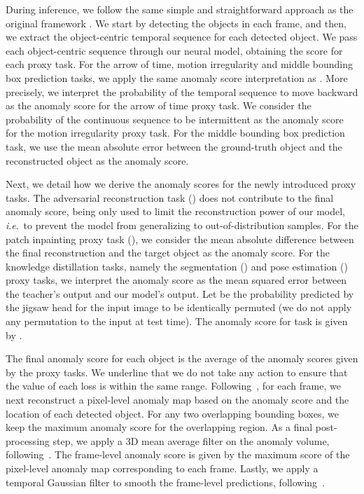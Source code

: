 \documentclass[times,twocolumn,final,authoryear]{elsarticle}
\newcommand{\ie}{\textit{i}.\textit{e}.}
\begin{document}
During inference, we follow the same simple and straightforward approach as the original framework \citep{Georgescu-CVPR-2021}. We start by detecting the objects in each frame, and then, we extract the object-centric temporal sequence for each detected object. We pass each object-centric sequence  through our neural model, obtaining the score for each proxy task. 
For the arrow of time, motion irregularity and middle bounding box prediction tasks, we apply the same anomaly score interpretation as \cite{Georgescu-CVPR-2021}. More precisely,  we interpret the probability of the temporal sequence to move backward as the anomaly score for the arrow of time proxy task. We consider the probability of the continuous sequence  to be intermittent as the anomaly score for the motion irregularity proxy task. For the middle bounding box prediction task, we use the mean absolute error between the ground-truth object and the reconstructed object as the anomaly score. 

Next, we detail how  we derive the anomaly scores for the newly introduced proxy tasks.
The adversarial reconstruction task () does not contribute to the final anomaly score, being only used to limit the reconstruction power of our model, \ie~to prevent the model from generalizing to out-of-distribution samples.
For the patch inpainting proxy task (), we consider the mean absolute difference between the final reconstruction and the target object as the anomaly score. For the knowledge distillation tasks, namely the segmentation () and pose estimation () proxy tasks, we interpret the anomaly score as the mean squared error between the teacher's output and our model's output. 
Let  be the probability predicted by the jigsaw head for the input image to be identically permuted (we do not apply any permutation to the input at test time). The anomaly score for task  is given by .

The final anomaly score for each object is the average of the anomaly scores given by the proxy tasks. We underline that we do not take any action to ensure that the value of each loss is within the same range. Following~\cite{Georgescu-CVPR-2021}, for each frame, we next reconstruct a pixel-level anomaly map based on the anomaly score and the location of each detected object. For any two overlapping bounding boxes, we keep the maximum anomaly score for the overlapping region. As a final post-processing step, we apply a 3D mean average filter on the anomaly volume, following~\cite{Giorno-ECCV-2016}. The frame-level anomaly score is given by the maximum score of the pixel-level anomaly map corresponding to each frame. Lastly, we apply a temporal Gaussian filter to smooth the frame-level predictions, following~\cite{Giorno-ECCV-2016}.
\end{document}
